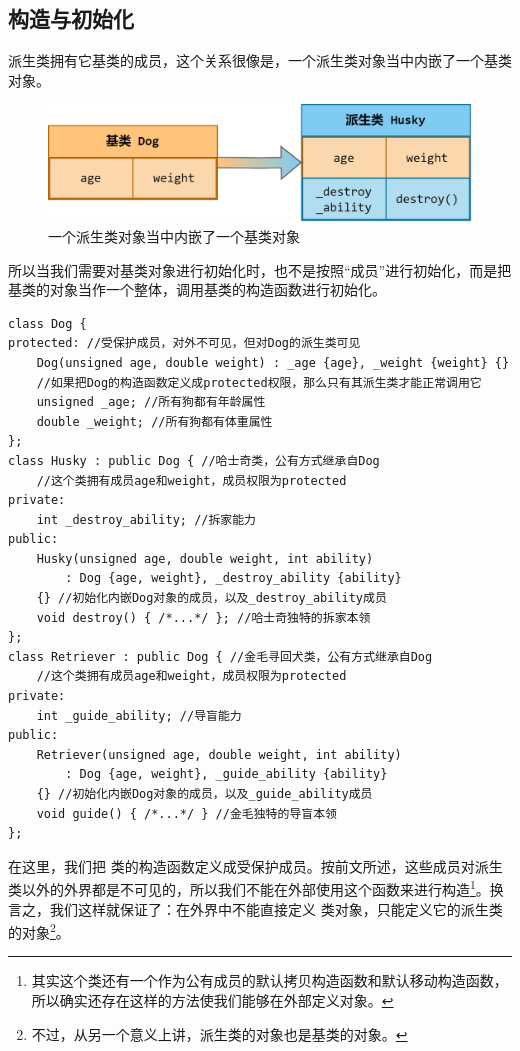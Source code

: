 \subsection*{构造与初始化}
派生类拥有它基类的成员，这个关系很像是，一个派生类对象当中内嵌了一个基类对象。
\begin{figure}[htbp]
    \centering
    \includegraphics[width=.8\textwidth]{images/generalized_parts/09_built_in_base_class_object_in_derived_class.png}
    \caption{一个派生类对象当中内嵌了一个基类对象}
\end{figure}
所以当我们需要对基类对象进行初始化时，也不是按照``成员''进行初始化，而是把基类的对象当作一个整体，调用基类的构造函数进行初始化。\par
\begin{lstlisting}
class Dog {
protected: //受保护成员，对外不可见，但对Dog的派生类可见
    Dog(unsigned age, double weight) : _age {age}, _weight {weight} {}
    //如果把Dog的构造函数定义成protected权限，那么只有其派生类才能正常调用它
    unsigned _age; //所有狗都有年龄属性
    double _weight; //所有狗都有体重属性
};
class Husky : public Dog { //哈士奇类，公有方式继承自Dog
    //这个类拥有成员age和weight，成员权限为protected
private:
    int _destroy_ability; //拆家能力
public:
    Husky(unsigned age, double weight, int ability)
        : Dog {age, weight}, _destroy_ability {ability}
    {} //初始化内嵌Dog对象的成员，以及_destroy_ability成员
    void destroy() { /*...*/ }; //哈士奇独特的拆家本领
};
class Retriever : public Dog { //金毛寻回犬类，公有方式继承自Dog
    //这个类拥有成员age和weight，成员权限为protected
private:
    int _guide_ability; //导盲能力
public:
    Retriever(unsigned age, double weight, int ability)
        : Dog {age, weight}, _guide_ability {ability}
    {} //初始化内嵌Dog对象的成员，以及_guide_ability成员
    void guide() { /*...*/ } //金毛独特的导盲本领
};
\end{lstlisting}\par
在这里，我们把 \lstinline@Dog@ 类的构造函数定义成受保护成员。按前文所述，这些成员对派生类以外的外界都是不可见的，所以我们不能在外部使用这个函数来进行构造\footnote{其实这个类还有一个作为公有成员的默认拷贝构造函数和默认移动构造函数，所以确实还存在这样的方法使我们能够在外部定义对象。}。换言之，我们这样就保证了：在外界中不能直接定义 \lstinline@Dog@ 类对象，只能定义它的派生类的对象\footnote{不过，从另一个意义上讲，派生类的对象也是基类的对象。}。\par
